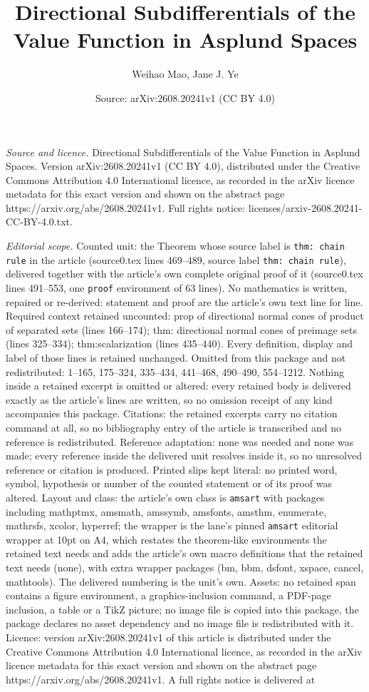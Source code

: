 \documentclass[10pt,a4paper]{amsart}
\title[Directional Subdifferentials of the Value Function in Asplun]{Directional Subdifferentials of the Value Function in Asplund Spaces}
\author{Weihao Mao, Jane J. Ye}
\date{Source: arXiv:2608.20241v1 (CC BY 4.0)}
\begin{document}
\maketitle

\noindent\emph{Source and licence.} Directional Subdifferentials of the Value Function in Asplund Spaces. Version arXiv:2608.20241v1 (CC BY 4.0), distributed under the Creative Commons Attribution 4.0 International licence, as recorded in the arXiv licence metadata for this exact version and shown on the abstract page https://arxiv.org/abs/2608.20241v1. Full rights notice: licenses/arxiv-2608.20241-CC-BY-4.0.txt.\par\smallskip

\noindent\textit{Editorial scope.} Counted unit: the Theorem whose source label is \texttt{thm: chain rule} in the article (source0.tex lines 469--489, source label \texttt{thm: chain rule}), delivered together with the article's own complete original proof of it (source0.tex lines 491--553, one \texttt{proof} environment of 63 lines). No mathematics is written, repaired or re-derived: statement and proof are the article's own text line for line. Required context retained uncounted: prop of directional normal cones of product of separated sets (lines 166--174); thm: directional normal cones of preimage sets (lines 325--334); thm:scalarization (lines 435--440). Every definition, display and label of those lines is retained unchanged. Omitted from this package and not redistributed: 1--165, 175--324, 335--434, 441--468, 490--490, 554--1212. Nothing inside a retained excerpt is omitted or altered: every retained body is delivered exactly as the article's lines are written, so no omission receipt of any kind accompanies this package. Citations: the retained excerpts carry no citation command at all, so no bibliography entry of the article is transcribed and no reference is redistributed. Reference adaptation: none was needed and none was made; every reference inside the delivered unit resolves inside it, so no unresolved reference or citation is produced. Printed slips kept literal: no printed word, symbol, hypothesis or number of the counted statement or of its proof was altered. Layout and class: the article's own class is \texttt{amsart} with packages including mathptmx, amsmath, amssymb, amsfonts, amsthm, enumerate, mathrsfs, xcolor, hyperref; the wrapper is the lane's pinned \texttt{amsart} editorial wrapper at 10pt on A4, which restates the theorem-like environments the retained text needs and adds the article's own macro definitions that the retained text needs (none), with extra wrapper packages (bm, bbm, dsfont, xspace, cancel, mathtools). The delivered numbering is the unit's own. Assets: no retained span contains a figure environment, a graphics-inclusion command, a PDF-page inclusion, a table or a TikZ picture; no image file is copied into this package, the package declares no asset dependency and no image file is redistributed with it. Licence: version arXiv:2608.20241v1 of this article is distributed under the Creative Commons Attribution 4.0 International licence, as recorded in the arXiv licence metadata for this exact version and shown on the abstract page https://arxiv.org/abs/2608.20241v1. A full rights notice is delivered at 
\end{document}

